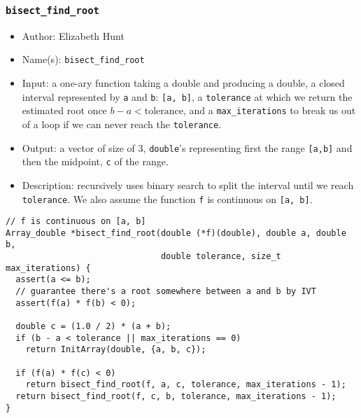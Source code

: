\documentclass[11pt]{article}
\begin{document}
\subsubsection{\texttt{bisect\_find\_root}}
\label{sec:org25382b3}
\begin{itemize}
\item Author: Elizabeth Hunt
\item Name(s): \texttt{bisect\_find\_root}
\item Input: a one-ary function taking a double and producing a double, a closed interval represented
by \texttt{a} and \texttt{b}: \texttt{[a, b]}, a \texttt{tolerance} at which we return the estimated root once \(b-a < \text{tolerance}\), and a
\texttt{max\_iterations} to break us out of a loop if we can never reach the \texttt{tolerance}.
\item Output: a vector of size of 3, \texttt{double}'s representing first the range \texttt{[a,b]} and then the midpoint,
\texttt{c} of the range.
\item Description: recursively uses binary search to split the interval until we reach \texttt{tolerance}. We
also assume the function \texttt{f} is continuous on \texttt{[a, b]}.
\end{itemize}

\begin{verbatim}
// f is continuous on [a, b]
Array_double *bisect_find_root(double (*f)(double), double a, double b,
                               double tolerance, size_t max_iterations) {
  assert(a <= b);
  // guarantee there's a root somewhere between a and b by IVT
  assert(f(a) * f(b) < 0);

  double c = (1.0 / 2) * (a + b);
  if (b - a < tolerance || max_iterations == 0)
    return InitArray(double, {a, b, c});

  if (f(a) * f(c) < 0)
    return bisect_find_root(f, a, c, tolerance, max_iterations - 1);
  return bisect_find_root(f, c, b, tolerance, max_iterations - 1);
}
\end{verbatim}
\end{document}
